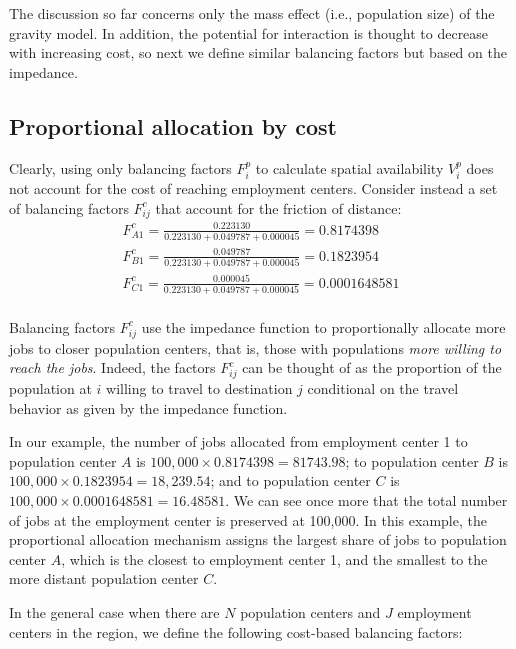 \documentclass[]{elsarticle} %
\begin{document}
The discussion so far concerns only the mass effect (i.e., population
size) of the gravity model. In addition, the potential for interaction
is thought to decrease with increasing cost, so next we define similar
balancing factors but based on the impedance.

\hypertarget{proportional-allocation-by-cost}{%
\subsection{Proportional allocation by
cost}\label{proportional-allocation-by-cost}}

Clearly, using only balancing factors \(F^p_{i}\) to calculate spatial
availability \(V^p_i\) does not account for the cost of reaching
employment centers. Consider instead a set of balancing factors
\(F^c_{ij}\) that account for the friction of distance: \[
\begin{array}{l}
F^c_{A1} = \frac{0.223130}{0.223130 + 0.049787 + 0.000045} = 0.8174398\\
F^c_{B1} = \frac{0.049787}{0.223130 + 0.049787 + 0.000045} = 0.1823954\\
F^c_{C1} = \frac{0.000045}{0.223130 + 0.049787 + 0.000045} = 0.0001648581\\
\end{array}
\]

Balancing factors \(F^c_{ij}\) use the impedance function to
proportionally allocate more jobs to closer population centers, that is,
those with populations \emph{more willing to reach the jobs}. Indeed,
the factors \(F^c_{ij}\) can be thought of as the proportion of the
population at \(i\) willing to travel to destination \(j\) conditional
on the travel behavior as given by the impedance function.

In our example, the number of jobs allocated from employment center 1 to
population center \(A\) is \(100,000\times 0.8174398 = 81743.98\); to
population center \(B\) is \(100,000\times 0.1823954 = 18,239.54\); and
to population center \(C\) is \(100,000\times 0.0001648581 = 16.48581\).
We can see once more that the total number of jobs at the employment
center is preserved at 100,000. In this example, the proportional
allocation mechanism assigns the largest share of jobs to population
center \(A\), which is the closest to employment center 1, and the
smallest to the more distant population center \(C\).

In the general case when there are \(N\) population centers and \(J\)
employment centers in the region, we define the following cost-based
balancing factors:
\end{document}
